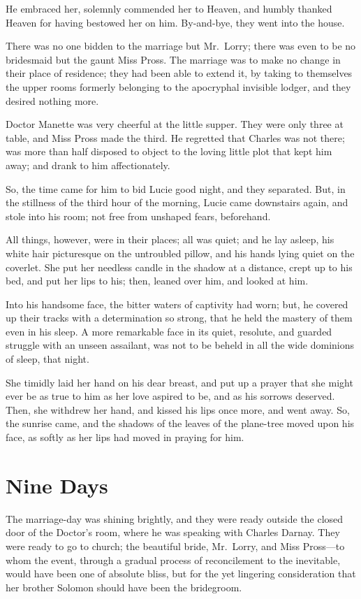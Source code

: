 He embraced her, solemnly commended her to Heaven, and humbly thanked
Heaven for having bestowed her on him.  By-and-bye, they went
into the house.

There was no one bidden to the marriage but Mr.\ Lorry; there was even
to be no bridesmaid but the gaunt Miss Pross.  The marriage was to
make no change in their place of residence; they had been able to
extend it, by taking to themselves the upper rooms formerly belonging
to the apocryphal invisible lodger, and they desired nothing more.

Doctor Manette was very cheerful at the little supper.  They were
only three at table, and Miss Pross made the third.  He regretted that
Charles was not there; was more than half disposed to object to the
loving little plot that kept him away; and drank to him affectionately.

So, the time came for him to bid Lucie good night, and they separated.
But, in the stillness of the third hour of the morning, Lucie came
downstairs again, and stole into his room; not free from unshaped fears,
beforehand.

All things, however, were in their places; all was quiet; and he lay
asleep, his white hair picturesque on the untroubled pillow, and his
hands lying quiet on the coverlet.  She put her needless candle in the
shadow at a distance, crept up to his bed, and put her lips to his;
then, leaned over him, and looked at him.

Into his handsome face, the bitter waters of captivity had worn; but,
he covered up their tracks with a determination so strong, that he held
the mastery of them even in his sleep.  A more remarkable face in its
quiet, resolute, and guarded struggle with an unseen assailant, was
not to be beheld in all the wide dominions of sleep, that night.

She timidly laid her hand on his dear breast, and put up a prayer that
she might ever be as true to him as her love aspired to be, and as his
sorrows deserved.  Then, she withdrew her hand, and kissed his lips
once more, and went away.  So, the sunrise came, and the shadows of
the leaves of the plane-tree moved upon his face, as softly as her
lips had moved in praying for him.



\chapter{Nine Days}


The marriage-day was shining brightly, and they were ready outside
the closed door of the Doctor's room, where he was speaking with
Charles Darnay.  They were ready to go to church; the beautiful bride,
Mr.\ Lorry, and Miss Pross---to whom the event, through a gradual process
of reconcilement to the inevitable, would have been one of absolute
bliss, but for the yet lingering consideration that her brother
Solomon should have been the bridegroom.

